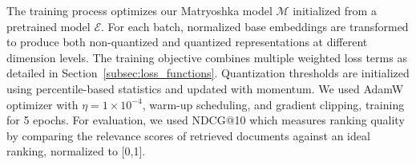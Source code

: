 The training process optimizes our Matryoshka model $\mathcal{M}$ initialized from a pretrained model $\mathcal{E}$. 
For each batch, normalized base embeddings are transformed to produce both non-quantized and quantized representations at different dimension levels. 
The training objective combines multiple weighted loss terms as detailed in Section~\ref{subsec:loss_functions}. %
Quantization thresholds are initialized using percentile-based statistics and updated with momentum. 
We used AdamW \cite{loshchilov2018decoupled} optimizer with $\eta = 1 \times 10^{-4}$, warm-up scheduling, and gradient clipping, training for 5 epochs. 
For evaluation, we used NDCG@10 which measures ranking quality by comparing the relevance scores of retrieved documents against an ideal ranking, normalized to [0,1].
